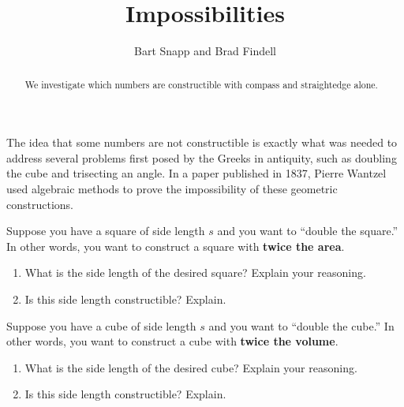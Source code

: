 \documentclass[nooutcomes]{ximera}
\title{Impossibilities}
\author{Bart Snapp and Brad Findell}
\begin{document}
\begin{abstract}
  We investigate which numbers are constructible with compass and
  straightedge alone.
\end{abstract}
\maketitle

The idea that some numbers are not constructible is exactly what was
needed to address several problems first posed by the Greeks in
antiquity, such as doubling the cube and trisecting an angle.  In a
paper published in 1837, Pierre Wantzel used algebraic methods to
prove the impossibility of these geometric constructions.

\begin{problem}
Suppose you have a square of side length $s$ and you want to ``double the square.''  In other words, you want to construct a square with \textbf{twice the area}.  
\begin{enumerate}
\item What is the side length of the desired square?  Explain your reasoning. 
\item Is this side length constructible?  Explain.  
\end{enumerate}
\end{problem}

\begin{problem}
Suppose you have a cube of side length $s$ and you want to ``double the cube.''  In other words, you want to construct a cube with \textbf{twice the volume}.  
\begin{enumerate}
\item What is the side length of the desired cube?  Explain your reasoning. 
\item Is this side length constructible?  Explain.  
\end{enumerate}
\end{problem}
\end{document}
